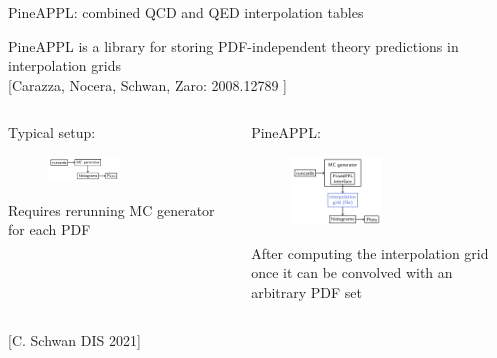 \documentclass[aspectratio=169, 8pt,t]{beamer}
\begin{document}
\begin{frame}{PineAPPL: combined QCD and QED interpolation tables}

  PineAPPL is a library for storing PDF-independent theory predictions in interpolation grids\\ {\color{gray}\small [Carazza, Nocera, Schwan, Zaro: 2008.12789 ]}
  \vspace*{1em}

  \begin{columns}
    \begin{column}{0.49\textwidth}
      Typical setup:
      \begin{figure}
        \includegraphics[width=0.5\textwidth]{figures/typicalsetup.png}
      \end{figure}
      Requires rerunning MC generator for each PDF
    \end{column}
    \begin{column}{0.49\textwidth}
      PineAPPL:
      \begin{figure}
        \includegraphics[width=0.5\textwidth]{figures/pineapplsetup.png}
      \end{figure}
      After computing the interpolation grid once it can be convolved with an arbitrary PDF set
    \end{column}
  \end{columns}
  \vfill\hfill{\color{gray}\small [C. Schwan DIS 2021]}
\end{frame}
\end{document}
